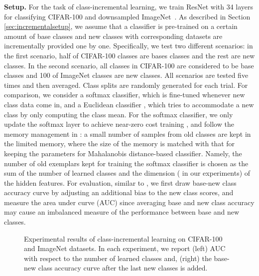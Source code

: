 \documentclass{article}
\begin{document}
{\bf Setup.} 
For the task of class-incremental learning, we train ResNet with 34 layers for classifying CIFAR-100 and downsampled ImageNet~\citep{chrabaszcz2017downsampled}.
As described in Section \ref{sec:incrementalsetup}, we assume that a classifier is pre-trained on a certain amount of base classes and new classes with corresponding datasets are incrementally provided one by one.
Specifically, we test two different scenarios:
in the first scenario, half of CIFAR-100 classes are bases classes and the rest are new classes.
In the second scenario, all classes in CIFAR-100 are considered to be base classes and 100 of ImageNet classes are new classes.
All scenarios are tested five times and then averaged.
Class splits are randomly generated for each trial.
For comparison, we consider a softmax classifier, which is fine-tuned whenever new class data come in, and a Euclidean classifier \citep{mensink2013distance}, which tries to accommodate a new class by only computing the class mean.
For the softmax classifier,
we only update the softmax layer to achieve near-zero cost training \citep{mensink2013distance}, and follow the memory management in \citet{rebuffi2017icarl}:
a small number of samples from old classes are kept in the limited memory, where the size of the memory is matched with that for keeping the parameters for Mahalanobis distance-based classifier.
Namely, the number of old exemplars kept for training the softmax classifier is chosen as the sum of the number of learned classes and the dimension ( in our experiments) of the hidden features. For evaluation, similar to \citep{lee2018hierarchical}, we first draw base-new class accuracy curve by adjusting an additional bias to the new class scores, and measure the area under curve (AUC) since averaging base and new class accuracy may cause an imbalanced measure of the performance between base and new classes.



\begin{figure*} [t] \centering\setlength{\tabcolsep}{0cm}
\caption{Experimental results of class-incremental learning on CIFAR-100 and ImageNet datasets.
In each experiment,
we report (left) AUC with respect to the number of learned classes and, 
(right) the base-new class accuracy curve after the last new classes is added.}
\label{fig:incremental}
\end{figure*}
\end{document}
